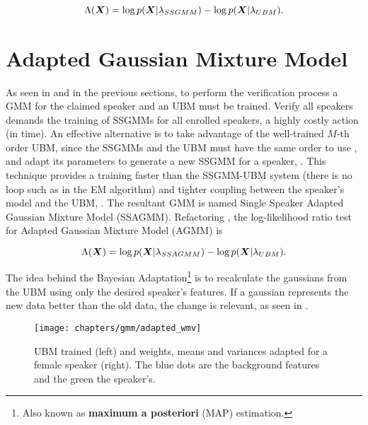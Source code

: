\begin{equation}
    \Lambda(\dvec{X}) = \log p(\dvec{X}|\lambda_{SSGMM}) - \log p(\dvec{X}|\lambda_{UBM}).
    \label{eq:score_of_X_ssgmm_ubm}
\end{equation}

\section{Adapted Gaussian Mixture Model}
\label{sec:adapted-gmm}

As seen in  and in the previous sections, to perform the verification process a GMM for the claimed speaker and an UBM must be trained. Verify all speakers demands the training of SSGMMs for all enrolled speakers, a highly costly action (in time). An effective alternative is to take advantage of the well-trained $M$-th order UBM, since the SSGMMs and the UBM must have the same order to use , and adapt its parameters to generate a new SSGMM for a speaker, . This technique provides a training faster than the SSGMM-UBM system (there is no loop such as in the EM algorithm) and tighter coupling between the speaker’s model and the UBM, . The resultant GMM is named Single Speaker Adapted Gaussian Mixture Model (SSAGMM). Refactoring , the log-likelihood ratio test for Adapted Gaussian Mixture Model (AGMM) is

\begin{equation}
    \Lambda(\dvec{X}) = \log p(\dvec{X}|\lambda_{SSAGMM}) - \log p(\dvec{X}|\lambda_{UBM}).
    \label{eq:score_of_X_ssagmm_ubm}
\end{equation}

The idea behind the Bayesian Adaptation\footnote{Also known as \textbf{maximum a posteriori} (MAP) estimation.} is to recalculate the gaussians from the UBM using only the desired speaker's features. If a gaussian represents the new data better than the old data, the change is relevant, as seen in .

\begin{figure}[ht]
    \centering
    \texttt{[image: chapters/gmm/adapted\_wmv]}
    \caption{UBM trained (left) and weights, means and variances adapted for a female speaker (right). The blue dots are the background features and the green the speaker's.}
    \label{fig:adapted_wmv}
\end{figure}

